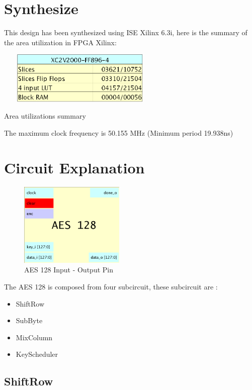 \documentclass[a4paper,12pt]{report}
\begin{document}
\section{Synthesize}

This design has been synthesized using ISE Xilinx 6.3i, here is the
summary of the area utilization in FPGA Xilinx:

\begin{table}[H]
\center
\includegraphics[width=8cm,height=2.5cm]{area.eps}
\caption{Area utilizations summary}
\label{area}
\end{table}

The maximum clock frequency is 50.155 MHz (Minimum period 19.938ns)

\section{Circuit Explanation}

\begin{figure}[H]
\center
\includegraphics[width=5cm,height=4cm]{aes128block.eps}
\caption{AES 128 Input - Output Pin}
\label{aes128block}
\end{figure}

The AES 128 is composed from four subcircuit, these subcircuit are :
\begin{itemize}
\item ShiftRow
\item SubByte
\item MixColumn
\item KeyScheduler
\end{itemize}

\subsection{ShiftRow}
\end{document}

